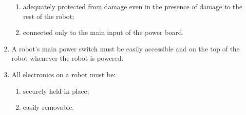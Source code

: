 \begin{enumerate}
\begin{enumerate}
    \item adequately protected from damage even in the presence of damage to the
          rest of the robot;
    \item connected only to the main input of the power board.
  \end{enumerate}
\item A robot's main power switch must be easily accessible and on the top of
      the robot whenever the robot is powered.
\item All electronics on a robot must be:
  \begin{enumerate}
    \item securely held in place;
    \item easily removable.
  \end{enumerate}
\end{enumerate}

